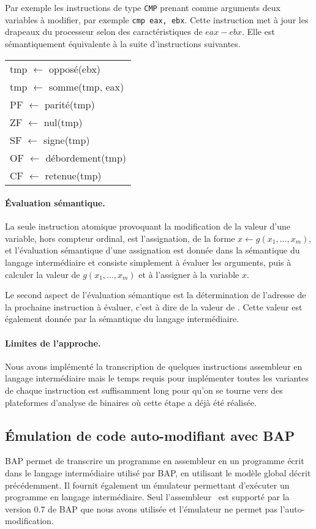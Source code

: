 Par exemple les instructions de type \texttt{CMP} prenant comme arguments deux variables à modifier, par exemple \texttt{cmp eax, ebx}.
Cette instruction met à jour les drapeaux du processeur selon des caractéristiques de $eax-ebx$.
Elle est sémantiquement équivalente à la suite d'instructions suivantes.
\begin{center}
\begin{tabular}[b]{l}
tmp $\leftarrow$ opposé(ebx)\\
tmp $\leftarrow$ somme(tmp, eax)\\
PF $\leftarrow$ parité(tmp) \\
ZF $\leftarrow$ nul(tmp) \\
SF $\leftarrow$ signe(tmp) \\
OF $\leftarrow$ débordement(tmp) \\
CF $\leftarrow$ retenue(tmp)
\end{tabular}
\end{center}

\paragraph{Évaluation sémantique.}
La seule instruction atomique provoquant la modification de la valeur d'une variable, hors compteur ordinal, est l'assignation, de la forme $x\leftarrow g(x_1, ..., x_m)$, et l'évaluation sémantique d'une assignation est donnée dans la sémantique du langage intermédiaire et consiste simplement à évaluer les arguments, puis à calculer la valeur de $g(x_1, ..., x_m)$ et à l'assigner à la variable $x$.

Le second aspect de l'évaluation sémantique est la détermination de l'adresse de la prochaine instruction à évaluer, c'est à dire de la valeur de \eip. Cette valeur est également donnée par la sémantique du langage intermédiaire.

\paragraph{Limites de l'approche.}
Nous avons implémenté la transcription de quelques instructions assembleur en langage intermédiaire mais le temps requis pour implémenter toutes les variantes de chaque instruction est suffisamment long pour qu'on se tourne vers des plateformes d'analyse de binaires où cette étape a déjà été réalisée.


\subsection{Émulation de code auto-modifiant avec BAP}
BAP permet de transcrire un programme en assembleur en un programme écrit dans le langage intermédiaire utilisé par BAP, en utilisant le modèle global décrit précédemment.
Il fournit également un émulateur permettant d'exécuter un programme en langage intermédiaire.
Seul l'assembleur \xq\ est supporté par la version 0.7 de BAP que nous avons utilisée et l'émulateur ne permet pas l'auto-modification.


